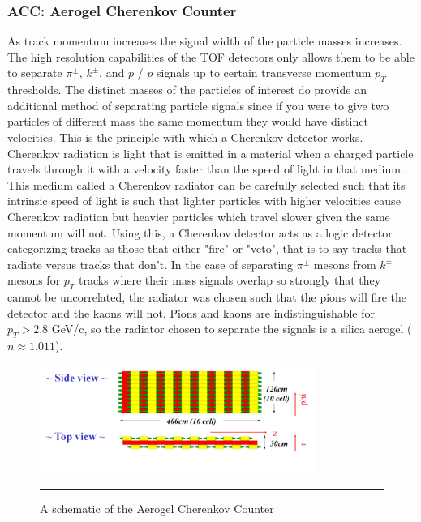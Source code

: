 \subsubsection{ACC: Aerogel Cherenkov Counter}
As track momentum increases the signal width of the particle masses increases. The high resolution capabilities of the TOF detectors only allows them to be able to separate $\pi^{\pm}$, $k^{\pm}$, and $p$ / $\bar{p}$ signals up to certain transverse momentum $p_{T}$ thresholds. The distinct masses of the particles of interest do provide an additional method of separating particle signals since if you were to give two particles of different mass the same momentum they would have distinct velocities. This is the principle with which a Cherenkov detector works. Cherenkov radiation is light that is emitted in a material when a charged particle travels through it with a velocity faster than the speed of light in that medium. This medium called a Cherenkov radiator can be carefully selected such that its intrinsic speed of light is such that lighter particles with higher velocities cause Cherenkov radiation but heavier particles which travel slower given the same momentum will not. Using this, a Cherenkov detector acts as a logic detector categorizing tracks as those that either "fire" or "veto", that is to say tracks that radiate versus tracks that don't. In the case of separating $\pi^{\pm}$ mesons from $k^{\pm}$ mesons for $p_{T}$ tracks where their mass signals overlap so strongly that they cannot be uncorrelated, the radiator was chosen such that the pions will fire the detector and the kaons will not. Pions and kaons are indistinguishable for $p_{T} > 2.8$ GeV/c, so the radiator chosen to separate the signals is a silica aerogel ($n \approx 1.011$).

\begin{figure}[htbp!]
  \centering
    \includegraphics[width=0.8\textwidth]{Figures/ACCschematic.jpg}
    \rule{35em}{0.5pt}
  \caption[A schematic of the Aerogel Cherenkov Counter]{A schematic of the Aerogel Cherenkov Counter}
  \label{fig:ACCschematic}
\end{figure}

